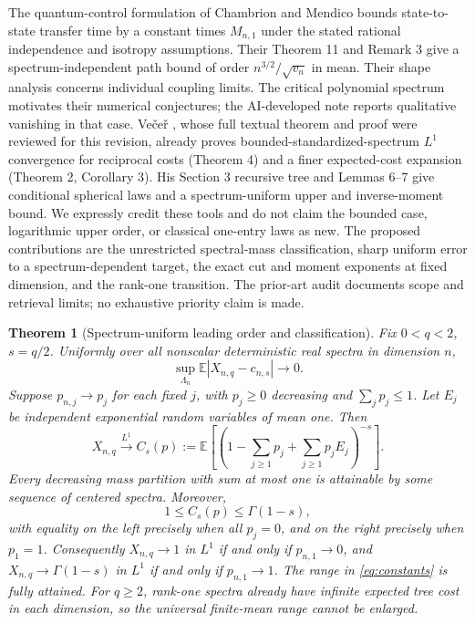 \documentclass[11pt]{article}
\newtheorem{theorem}{Theorem}
\newcommand{\E}{\mathbb E}
\begin{document}
The quantum-control formulation of Chambrion and Mendico \cite{CMcontrol,CMnumerical} bounds state-to-state transfer time by a constant times $M_{n,1}$ under the stated rational independence and isotropy assumptions. Their Theorem 11 and Remark 3 give a spectrum-independent path bound of order $n^{3/2}/\sqrt{v_n}$ in mean. Their shape analysis concerns individual coupling limits. The critical polynomial spectrum motivates their numerical conjectures; the AI-developed note \cite{IRSI} reports qualitative vanishing in that case. Ve\v{c}e\v{r} \cite{Vecer}, whose full textual theorem and proof were reviewed for this revision, already proves bounded-standardized-spectrum $L^1$ convergence for reciprocal costs (Theorem 4) and a finer expected-cost expansion (Theorem 2, Corollary 3). His Section 3 recursive tree and Lemmas 6--7 give conditional spherical laws and a spectrum-uniform upper and inverse-moment bound. We expressly credit these tools and do not claim the bounded case, logarithmic upper order, or classical one-entry laws as new. The proposed contributions are the unrestricted spectral-mass classification, sharp uniform error to a spectrum-dependent target, the exact cut and moment exponents at fixed dimension, and the rank-one transition. The prior-art audit documents scope and retrieval limits; no exhaustive priority claim is made.

\begin{theorem}[Spectrum-uniform leading order and classification]\label{thm:main}
Fix $0<q<2$, $s=q/2$. Uniformly over all nonscalar deterministic real spectra in dimension $n$,
\begin{equation}
\sup_{\Lambda_n}\E|X_{n,q}-c_{n,s}|\longrightarrow0.
\label{eq:uniform}
\end{equation}
Suppose $p_{n,j}\to p_j$ for each fixed $j$, with $p_j\ge0$ decreasing and $\sum_jp_j\le1$. Let $E_j$ be independent exponential random variables of mean one. Then
\begin{equation}
 X_{n,q}\xrightarrow{L^1}C_s(p):=\E\left[\left(1-\sum_{j\ge1}p_j+\sum_{j\ge1}p_jE_j\right)^{-s}\right].\label{eq:classification}
\end{equation}
Every decreasing mass partition with sum at most one is attainable by some sequence of centered spectra. Moreover,
\begin{equation}
1\le C_s(p)\le\Gamma(1-s),\label{eq:constants}
\end{equation}
with equality on the left precisely when all $p_j=0$, and on the right precisely when $p_1=1$. Consequently $X_{n,q}\to1$ in $L^1$ if and only if $p_{n,1}\to0$, and $X_{n,q}\to\Gamma(1-s)$ in $L^1$ if and only if $p_{n,1}\to1$. The range in \eqref{eq:constants} is fully attained. For $q\ge2$, rank-one spectra already have infinite expected tree cost in each dimension, so the universal finite-mean range cannot be enlarged.
\end{theorem}
\end{document}
